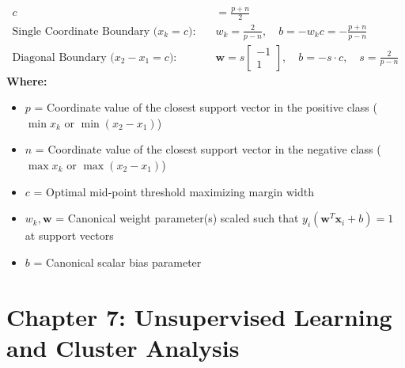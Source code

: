 \begin{formulabox}
\begin{align*}
    c &= \frac{p + n}{2} \\[2pt]
    \text{Single Coordinate Boundary ($x_k = c$):} \quad & w_k = \frac{2}{p - n}, \quad b = -w_k c = -\frac{p + n}{p - n} \\[2pt]
    \text{Diagonal Boundary ($x_2 - x_1 = c$):} \quad & \mathbf{w} = s \begin{bmatrix} -1 \\ 1 \end{bmatrix}, \quad b = -s \cdot c, \quad s = \frac{2}{p - n}
\end{align*}
\textbf{Where:}
\begin{itemize}[noitemsep, topsep=1pt]
    \item $p$ = Coordinate value of the closest support vector in the positive class ($\min x_k$ or $\min (x_2 - x_1)$)
    \item $n$ = Coordinate value of the closest support vector in the negative class ($\max x_k$ or $\max (x_2 - x_1)$)
    \item $c$ = Optimal mid-point threshold maximizing margin width
    \item $w_k, \mathbf{w}$ = Canonical weight parameter(s) scaled such that $y_i(\mathbf{w}^T \mathbf{x}_i + b) = 1$ at support vectors
    \item $b$ = Canonical scalar bias parameter
\end{itemize}
\end{formulabox}

\section*{Chapter 7: Unsupervised Learning and Cluster Analysis}

